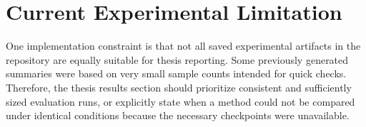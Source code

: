 \section{Current Experimental Limitation}

One implementation constraint is that not all saved experimental artifacts in the repository are equally suitable for thesis reporting. Some previously generated summaries were based on very small sample counts intended for quick checks. Therefore, the thesis results section should prioritize consistent and sufficiently sized evaluation runs, or explicitly state when a method could not be compared under identical conditions because the necessary checkpoints were unavailable.

